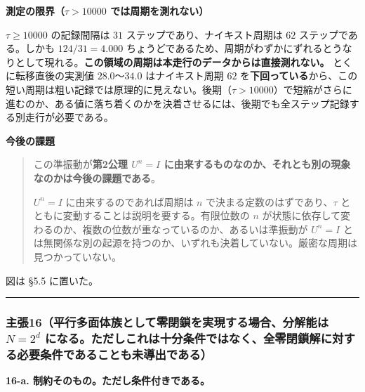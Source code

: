 \documentclass[
  10pt,
]{ltjsarticle}
\begin{document}
\textbf{測定の限界（\(\tau > 10000\) では周期を測れない）}

\(\tau \ge 10000\) の記録間隔は \(31\) ステップであり、ナイキスト周期は
\(62\) ステップである。しかも \(124 / 31 = 4.000\)
ちょうどであるため、周期がわずかにずれるとうなりとして現れる。\textbf{この領域の周期は本走行のデータからは直接測れない。}
とくに転移直後の実測値 \(28.0\)〜\(34.0\) はナイキスト周期 \(62\)
を\textbf{下回っている}から、この短い周期は粗い記録では原理的に見えない。後期（\(\tau > 10000\)）で短縮がさらに進むのか、ある値に落ち着くのかを決着させるには、後期でも全ステップ記録する別走行が必要である。

\textbf{今後の課題}

\begin{quote}
この準振動が\textbf{第2公理 \(U^n = I\)
に由来するものなのか、それとも別の現象なのかは今後の課題である}。

\(U^n = I\) に由来するのであれば周期は \(n\)
で決まる定数のはずであり、\(\tau\)
とともに変動することは説明を要する。有限位数の \(n\)
が状態に依存して変わるのか、複数の位数が重なっているのか、あるいは準振動が
\(U^n = I\)
とは無関係な別の起源を持つのか、いずれも決着していない。厳密な周期は見つかっていない。
\end{quote}

図は §5.5 に置いた。

\begin{center}\rule{0.5\linewidth}{0.5pt}\end{center}

\subsubsection{\texorpdfstring{主張16（平行多面体族として零閉鎖を実現する場合、分解能は
\(N = 2^d\)
になる。ただしこれは十分条件ではなく、全零閉鎖解に対する必要条件であることも未導出である）}{主張16（平行多面体族として零閉鎖を実現する場合、分解能は N = 2\^{}d になる。ただしこれは十分条件ではなく、全零閉鎖解に対する必要条件であることも未導出である）}}\label{ux4e3bux5f3516ux5e73ux884cux591aux9762ux4f53ux65cfux3068ux3057ux3066ux96f6ux9589ux9396ux3092ux5b9fux73feux3059ux308bux5834ux5408ux5206ux89e3ux80fdux306f-n-2d-ux306bux306aux308bux305fux3060ux3057ux3053ux308cux306fux5341ux5206ux6761ux4ef6ux3067ux306fux306aux304fux5168ux96f6ux9589ux9396ux89e3ux306bux5bfeux3059ux308bux5fc5ux8981ux6761ux4ef6ux3067ux3042ux308bux3053ux3068ux3082ux672aux5c0eux51faux3067ux3042ux308b}

\textbf{16-a. 制約そのもの。ただし条件付きである。}
\end{document}
